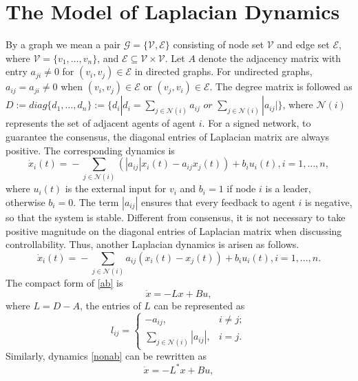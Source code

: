 \documentclass[a4paper,11pt]{article}
\begin{document}
\section{The Model of Laplacian Dynamics}
By a graph we mean a pair $\mathcal{G}=\{\mathcal{V},\mathcal{E}\}$ consisting of node set $\mathcal{V}$ and edge set $\mathcal{E}$, where $\mathcal{V}=\{v_1,\ldots,v_n\}$, and $\mathcal{E}\subseteq \mathcal{V}\times\mathcal{V}$. Let $A$ denote the adjacency matrix with entry $a_{ji}\ne 0$ for $(v_i,v_j)\in\mathcal{E}$ in directed graphs. For undirected graphs, $a_{ij}=a_{ji}\ne0$ when $(v_i,v_j)\in\mathcal{E}$ or $(v_j,v_i)\in\mathcal{E}$. The degree matrix is followed as $D:=diag\{d_1,\ldots,d_n\}:=\{d_i|d_i=\sum_{j\in \mathcal{N}(i)}a_{ij}\textit{ or }\sum_{j\in \mathcal{N}(i)}|a_{ij}|\}$, where $\mathcal{N}(i)$ represents the set of adjacent agents of agent $i$.
For a signed network, to guarantee the consensus, the diagonal entries of Laplacian matrix are always positive. The corresponding dynamics is
\begin{equation}\label{ab}
  \!\dot x_i(t)\!\!=\!-\!\!\!\!\!\!\sum\limits_{j\in \mathcal{N}(i)}\!\!\!(|a_{ij}|x_i(t)-a_{ij}x_j(t))+b_iu_i(t),i\!=\!1,\ldots,n,
\end{equation}
where $u_i(t)$ is the external input for $v_i$ and $b_i=1$ if node $i$ is a leader, otherwise $b_i=0$. The term $|a_{ij}|$ ensures that every feedback to agent $i$ is negative, so that the system is stable. Different from consensus, it is not necessary to take positive magnitude on the diagonal entries of Laplacian matrix when discussing controllability. Thus, another Laplacian dynamics is arisen as follows.
\begin{equation}\label{nonab}
 \dot x_i(t)\!=\!-\!\!\!\!\sum\limits_{j\in \mathcal{N}(i)}a_{ij}(x_i(t)-x_j(t))+b_iu_i(t),i=1,\ldots,n.
\end{equation}
The compact form of \eqref{ab} is
\begin{equation}\label{protocol}
  \dot x=-Lx+Bu,
\end{equation}
where $L=D-A$, the entries of $L$ can be represented as
\begin{equation}
{l_{ij}}= \left\{ \begin{array}{*{20}{c}}
{-a_{ij},} & \textrm{$i\ne j;$}\\
 \sum\limits_{j\in \mathcal{N}(i)}|a_{ij}|,& \textrm{$i=j.$}
\end{array} \right.
\end{equation}
Similarly, dynamics \eqref{nonab} can be rewritten as
\begin{equation}
  \dot x=-L^*x+Bu,
\end{equation}
\end{document}
